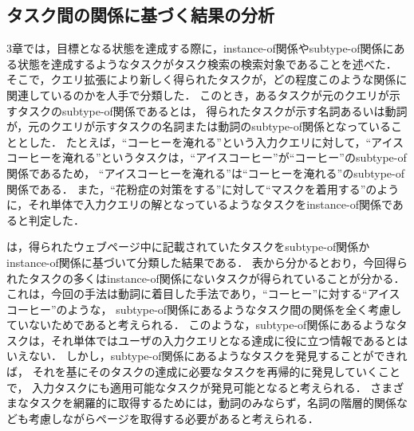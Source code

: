 \documentclass[submit,techreq]{ipsj}
\begin{document}
\subsection{タスク間の関係に基づく結果の分析}
3章では，目標となる状態を達成する際に，instance-of関係やsubtype-of関係にある状態を達成するようなタスクがタスク検索の検索対象であることを述べた．
そこで，クエリ拡張により新しく得られたタスクが，どの程度このような関係に関連しているのかを人手で分類した．
このとき，あるタスクが元のクエリが示すタスクのsubtype-of関係であるとは，
得られたタスクが示す名詞あるいは動詞が，元のクエリが示すタスクの名詞または動詞のsubtype-of関係となっていることとした．
たとえば，``コーヒーを淹れる''という入力クエリに対して，``アイスコーヒーを淹れる''というタスクは，``アイスコーヒー''が``コーヒー''のsubtype-of関係であるため，
``アイスコーヒーを淹れる''は``コーヒーを淹れる''のsubtype-of関係である．
また，``花粉症の対策をする''に対して``マスクを着用する''のように，それ単体で入力クエリの解となっているようなタスクをinstance-of関係であると判定した．

は，得られたウェブページ中に記載されていたタスクをsubtype-of関係かinstance-of関係に基づいて分類した結果である．
表から分かるとおり，今回得られたタスクの多くはinstance-of関係にないタスクが得られていることが分かる．
これは，今回の手法は動詞に着目した手法であり，``コーヒー''に対する``アイスコーヒー''のような，
subtype-of関係にあるようなタスク間の関係を全く考慮していないためであると考えられる．
このような，subtype-of関係にあるようなタスクは，それ単体ではユーザの入力クエリとなる達成に役に立つ情報であるとはいえない．
しかし，subtype-of関係にあるようなタスクを発見することができれば，
それを基にそのタスクの達成に必要なタスクを再帰的に発見していくことで，
入力タスクにも適用可能なタスクが発見可能となると考えられる．
さまざまなタスクを網羅的に取得するためには，動詞のみならず，名詞の階層的関係なども考慮しながらページを取得する必要があると考えられる．

%
\end{document}
